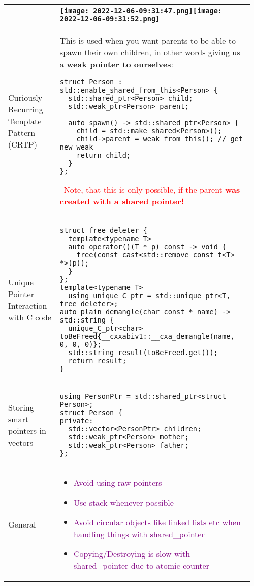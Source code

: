 \documentclass[main.tex,fontsize=8pt,paper=a4,paper=portrait,DIV=calc,]{scrartcl}
\begin{document}
\begin{table}[ht!]
\begin{tabular}{|m{0.2\linewidth}|m{0.755\linewidth}|}
\hline
& 
\texttt{[image: 2022-12-06-09:31:47.png]}\texttt{[image: 2022-12-06-09:31:52.png]}\\
\hline
Curiously Recurring Template Pattern (CRTP) & 
This is used when you want parents to be able to spawn their own children, in other words giving us a \textbf{weak pointer to ourselves}:\newline
\begin{lstlisting}
struct Person : std::enable_shared_from_this<Person> {
  std::shared_ptr<Person> child;
  std::weak_ptr<Person> parent;

  auto spawn() -> std::shared_ptr<Person> {
    child = std::make_shared<Person>();
    child->parent = weak_from_this(); // get new weak
    return child;
  }
};
\end{lstlisting} 
\, \newline
\textcolor{red}{Note, that this is only possible, if the parent \textbf{was created with a shared pointer!}}\\
\hline
Unique Pointer Interaction with C code & 
\vspace{2mm}
\begin{lstlisting}
struct free_deleter {
  template<typename T>
  auto operator()(T * p) const -> void {
    free(const_cast<std::remove_const_t<T> *>(p));
  }
};
template<typename T>
  using unique_C_ptr = std::unique_ptr<T, free_deleter>;
auto plain_demangle(char const * name) -> std::string {
  unique_C_ptr<char> toBeFreed{__cxxabiv1::__cxa_demangle(name, 0, 0, 0)};
  std::string result(toBeFreed.get());
  return result;
}
\end{lstlisting}\\
\hline
Storing smart pointers in vectors & 
\vspace{2mm}
\begin{lstlisting}
using PersonPtr = std::shared_ptr<struct Person>;
struct Person {
private:
  std::vector<PersonPtr> children;
  std::weak_ptr<Person> mother;
  std::weak_ptr<Person> father;
};
\end{lstlisting}\\
\hline
General & 
\vspace{2mm}
\begin{itemize}
\item \textcolor{purple}{Avoid using raw pointers}
\item \textcolor{purple}{Use stack whenever possible}
\item \textcolor{purple}{Avoid circular objects like linked lists etc when handling things with shared\_pointer}
\item \textcolor{purple}{Copying/Destroying is slow with shared\_pointer due to atomic counter}
\vspace{-3mm}
\end{itemize}\\ 
\hline
\end{tabular}
\end{table}
\end{document}
